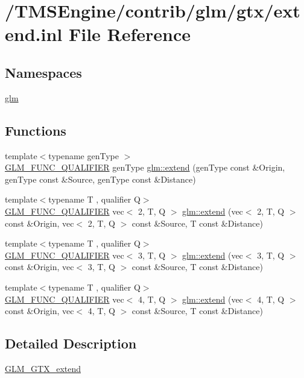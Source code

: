 \hypertarget{extend_8inl}{}\section{/\+T\+M\+S\+Engine/contrib/glm/gtx/extend.inl File Reference}
\label{extend_8inl}
\subsection*{Namespaces}
\begin{DoxyCompactItemize}
\item 
 \hyperlink{namespaceglm}{glm}
\end{DoxyCompactItemize}
\subsection*{Functions}
\begin{DoxyCompactItemize}
\item 
{\footnotesize template$<$typename gen\+Type $>$ }\\\hyperlink{setup_8hpp_a33fdea6f91c5f834105f7415e2a64407}{G\+L\+M\+\_\+\+F\+U\+N\+C\+\_\+\+Q\+U\+A\+L\+I\+F\+I\+ER} gen\+Type \hyperlink{namespaceglm_a88c4890406fab3280de470ce780e6b9d}{glm\+::extend} (gen\+Type const \&Origin, gen\+Type const \&Source, gen\+Type const \&Distance)
\item 
{\footnotesize template$<$typename T , qualifier Q$>$ }\\\hyperlink{setup_8hpp_a33fdea6f91c5f834105f7415e2a64407}{G\+L\+M\+\_\+\+F\+U\+N\+C\+\_\+\+Q\+U\+A\+L\+I\+F\+I\+ER} vec$<$ 2, T, Q $>$ \hyperlink{namespaceglm_ae7c7294c06e86839130ca7744162731c}{glm\+::extend} (vec$<$ 2, T, Q $>$ const \&Origin, vec$<$ 2, T, Q $>$ const \&Source, T const \&Distance)
\item 
{\footnotesize template$<$typename T , qualifier Q$>$ }\\\hyperlink{setup_8hpp_a33fdea6f91c5f834105f7415e2a64407}{G\+L\+M\+\_\+\+F\+U\+N\+C\+\_\+\+Q\+U\+A\+L\+I\+F\+I\+ER} vec$<$ 3, T, Q $>$ \hyperlink{namespaceglm_a9e3293f635716225ee23cb298a04a02f}{glm\+::extend} (vec$<$ 3, T, Q $>$ const \&Origin, vec$<$ 3, T, Q $>$ const \&Source, T const \&Distance)
\item 
{\footnotesize template$<$typename T , qualifier Q$>$ }\\\hyperlink{setup_8hpp_a33fdea6f91c5f834105f7415e2a64407}{G\+L\+M\+\_\+\+F\+U\+N\+C\+\_\+\+Q\+U\+A\+L\+I\+F\+I\+ER} vec$<$ 4, T, Q $>$ \hyperlink{namespaceglm_a4ac1a18c2563193bbc65b772e9bbc25d}{glm\+::extend} (vec$<$ 4, T, Q $>$ const \&Origin, vec$<$ 4, T, Q $>$ const \&Source, T const \&Distance)
\end{DoxyCompactItemize}


\subsection{Detailed Description}
\hyperlink{group__gtx__extend}{G\+L\+M\+\_\+\+G\+T\+X\+\_\+extend} 